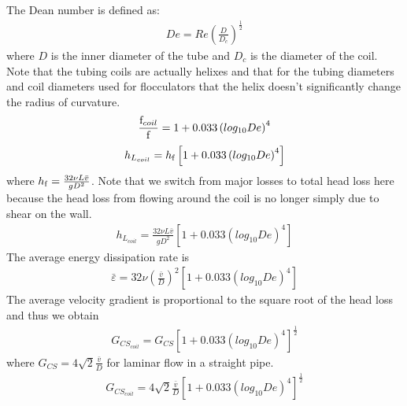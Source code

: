\documentclass[letterpaper,10pt,english]{sphinxmanual}
\begin{document}
The Dean number is defined as:
\begin{equation}\label{equation:Rapid_Mix/RM_Derivations:Rapid_Mix/RM_Derivations:89}
\begin{split}De = Re\left(\frac{D}{D_c}\right)^\frac{1}{2}\end{split}
\end{equation}
where \(D\) is the inner diameter of the tube and \(D_c\) is the diameter of the coil. Note that the tubing coils are actually helixes and that for the tubing diameters and coil diameters used for flocculators that the helix doesn’t significantly change the radius of curvature.
\begin{equation}\label{equation:Rapid_Mix/RM_Derivations:Rapid_Mix/RM_Derivations:90}
\begin{split}\frac{{\rm f}_{coil}}{{\rm f}} = 1 + 0.033\left(log_{10}De\right)^4\end{split}
\end{equation}\begin{equation}\label{equation:Rapid_Mix/RM_Derivations:Rapid_Mix/RM_Derivations:91}
\begin{split}h_{L_{coil}} = h_{{\rm f}} \left[ 1 + 0.033\left(log_{10}De\right)^4 \right]\end{split}
\end{equation}
where \(h_{{\rm f}} = \frac{32\nu L\bar v}{ g D^2}\). Note that we switch from major losses to total head loss here because the head loss from flowing around the coil is no longer simply due to shear on the
wall.
\begin{equation}\label{equation:Rapid_Mix/RM_Derivations:Rapid_Mix/RM_Derivations:92}
\begin{split}h_{L_{coil}} = \frac{32\nu L\bar v}{ g D^2} \left[ 1 + 0.033\left(log_{10}De\right)^4 \right]\end{split}
\end{equation}
The average energy dissipation rate is
\begin{equation}\label{equation:Rapid_Mix/RM_Derivations:Rapid_Mix/RM_Derivations:93}
\begin{split}\bar\varepsilon = 32\nu \left( \frac{\bar v}{D} \right)^2 \left[ 1 + 0.033\left(log_{10}De\right)^4 \right]\end{split}
\end{equation}
The average velocity gradient is proportional to the square root of the head loss and thus we obtain
\begin{equation}\label{equation:Rapid_Mix/RM_Derivations:Rapid_Mix/RM_Derivations:94}
\begin{split}G_{CS_{coil}} = G_{CS}\left[ 1 + 0.033\left(log_{10}De\right)^4  \right]^\frac{1}{2}\end{split}
\end{equation}
where \(G_{CS} =4\sqrt2 \frac{\bar v}{D}\) for laminar flow in a straight pipe.
\begin{equation}\label{equation:Rapid_Mix/RM_Derivations:Rapid_Mix/RM_Derivations:95}
\begin{split}G_{CS_{coil}} = 4\sqrt2 \frac{\bar v}{D}\left[ 1 + 0.033\left(log_{10}De\right)^4  \right]^\frac{1}{2}\end{split}
\end{equation}
\end{document}
